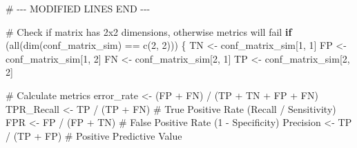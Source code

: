 \documentclass[
  letterpaper,
]{scrbook}
\newenvironment{Shaded}{\begin{snugshade}}{\end{snugshade}}
\newcommand{\CommentTok}[1]{\textcolor[rgb]{0.37,0.37,0.37}{#1}}
\newcommand{\ControlFlowTok}[1]{\textcolor[rgb]{0.00,0.23,0.31}{\textbf{#1}}}
\newcommand{\DecValTok}[1]{\textcolor[rgb]{0.68,0.00,0.00}{#1}}
\newcommand{\FunctionTok}[1]{\textcolor[rgb]{0.28,0.35,0.67}{#1}}
\newcommand{\NormalTok}[1]{\textcolor[rgb]{0.00,0.23,0.31}{#1}}
\newcommand{\OtherTok}[1]{\textcolor[rgb]{0.00,0.23,0.31}{#1}}
\newcommand{\RegionMarkerTok}[1]{\textcolor[rgb]{0.00,0.23,0.31}{#1}}
\newcommand{\SpecialCharTok}[1]{\textcolor[rgb]{0.37,0.37,0.37}{#1}}
\begin{document}
\begin{Shaded}
\begin{Highlighting}[]
\CommentTok{\# {-}{-}{-} MODIFIED LINES }\RegionMarkerTok{END}\CommentTok{ {-}{-}{-}}


\CommentTok{\# Check if matrix has 2x2 dimensions, otherwise metrics will fail}
\ControlFlowTok{if}\NormalTok{ (}\FunctionTok{all}\NormalTok{(}\FunctionTok{dim}\NormalTok{(conf\_matrix\_sim) }\SpecialCharTok{==} \FunctionTok{c}\NormalTok{(}\DecValTok{2}\NormalTok{, }\DecValTok{2}\NormalTok{))) \{}
\NormalTok{  TN }\OtherTok{\textless{}{-}}\NormalTok{ conf\_matrix\_sim[}\DecValTok{1}\NormalTok{, }\DecValTok{1}\NormalTok{]}
\NormalTok{  FP }\OtherTok{\textless{}{-}}\NormalTok{ conf\_matrix\_sim[}\DecValTok{1}\NormalTok{, }\DecValTok{2}\NormalTok{]}
\NormalTok{  FN }\OtherTok{\textless{}{-}}\NormalTok{ conf\_matrix\_sim[}\DecValTok{2}\NormalTok{, }\DecValTok{1}\NormalTok{]}
\NormalTok{  TP }\OtherTok{\textless{}{-}}\NormalTok{ conf\_matrix\_sim[}\DecValTok{2}\NormalTok{, }\DecValTok{2}\NormalTok{]}

  \CommentTok{\# Calculate metrics}
\NormalTok{  error\_rate }\OtherTok{\textless{}{-}}\NormalTok{ (FP }\SpecialCharTok{+}\NormalTok{ FN) }\SpecialCharTok{/}\NormalTok{ (TP }\SpecialCharTok{+}\NormalTok{ TN }\SpecialCharTok{+}\NormalTok{ FP }\SpecialCharTok{+}\NormalTok{ FN)}
\NormalTok{  TPR\_Recall }\OtherTok{\textless{}{-}}\NormalTok{ TP }\SpecialCharTok{/}\NormalTok{ (TP }\SpecialCharTok{+}\NormalTok{ FN) }\CommentTok{\# True Positive Rate (Recall / Sensitivity)}
\NormalTok{  FPR }\OtherTok{\textless{}{-}}\NormalTok{ FP }\SpecialCharTok{/}\NormalTok{ (FP }\SpecialCharTok{+}\NormalTok{ TN)      }\CommentTok{\# False Positive Rate (1 {-} Specificity)}
\NormalTok{  Precision }\OtherTok{\textless{}{-}}\NormalTok{ TP }\SpecialCharTok{/}\NormalTok{ (TP }\SpecialCharTok{+}\NormalTok{ FP)  }\CommentTok{\# Positive Predictive Value}


\end{Highlighting}
\end{Shaded}
\end{document}
